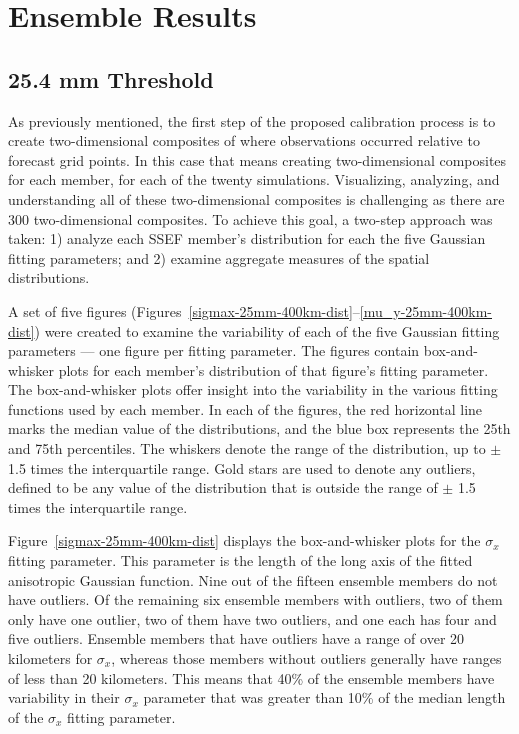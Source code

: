 

\section{Ensemble Results}
\label{eresults}




\subsection{25.4 mm Threshold}
\label{eresults_25.4mm}

As previously mentioned, the first step of the proposed calibration process is to create two-dimensional composites of where observations occurred relative to forecast grid points.
In this case that means creating two-dimensional composites for each member, for each of the twenty simulations.
Visualizing, analyzing, and understanding all of these two-dimensional composites is challenging as there are 300 two-dimensional composites.
To achieve this goal, a two-step approach was taken: 1) analyze each SSEF member's distribution for each the five Gaussian fitting parameters; and 2) examine aggregate measures of the spatial distributions.


A set of five figures (\mbox{Figures \ref{sigmax-25mm-400km-dist}--\ref{mu_y-25mm-400km-dist}}) were created to examine the variability of each of the five Gaussian fitting parameters --- one figure per fitting parameter.
The figures contain box-and-whisker plots for each member's distribution of that figure's fitting parameter.
The box-and-whisker plots offer insight into the variability in the various fitting functions used by each member.
In each of the figures, the red horizontal line marks the median value of the distributions, and the blue box represents the 25th and 75th percentiles.
The whiskers denote the range of the distribution, up to $\pm$ 1.5 times the interquartile range.
Gold stars are used to denote any outliers, defined to be any value of the distribution that is outside the range of $\pm$ 1.5 times the interquartile range.


\mbox{Figure \ref{sigmax-25mm-400km-dist}} displays the box-and-whisker plots for the $\sigma_x$ fitting parameter.
This parameter is the length of the long axis of the fitted anisotropic Gaussian function.
Nine out of the fifteen ensemble members do not have outliers.
Of the remaining six ensemble members with outliers, two of them only have one outlier, two of them have two outliers, and one each has four and five outliers.
Ensemble members that have outliers have a range of over 20 kilometers for $\sigma_x$, whereas those members without outliers generally have ranges of less than 20 kilometers.
This means that 40\% of the ensemble members have variability in their $\sigma_x$ parameter that was greater than 10\% of the median length of the $\sigma_x$ fitting parameter.


